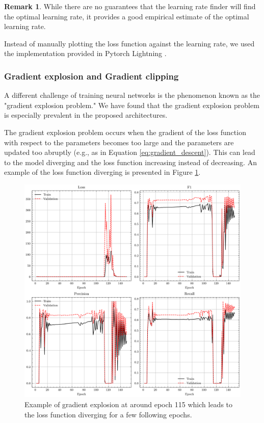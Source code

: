 \documentclass[a4paper, twoside]{report}
\theoremstyle{definition}
\newtheorem{remark}[theorem]{Remark}
\numberwithin{equation}{section}
\begin{document}
\begin{remark}
    While there are no guarantees that the learning rate finder will find the optimal learning rate,
    it provides a good empirical estimate of the optimal learning rate.
\end{remark}

Instead of manually plotting the loss function against the learning rate, we used the implementation
provided in Pytorch Lightning \cite{lightning.ai_2023_lr_finder}.


\subsubsection{Gradient explosion and Gradient clipping} \label{sec:gradient_clipping}
A different challenge of training neural networks is the phenomenon known as the "gradient explosion problem."
We have found that the gradient explosion problem is especially prevalent in the proposed architectures.

The gradient explosion problem occurs when the gradient of the loss function with respect to the parameters
becomes too large and the parameters are updated too abruptly (e.g., as in Equation \ref{eq:gradient_descent}).
This can lead to the model diverging and the loss function increasing instead of decreasing.
An example of the loss function diverging is presented in Figure \ref{fig:gradient_explosion}.

\begin{figure}[h!]
    \centering
    \includegraphics[scale=0.6]{gradient_explosion.png}
    \caption{Example of gradient explosion at around epoch 115 which leads to the loss function diverging for a few following epochs.}
    \label{fig:gradient_explosion}
\end{figure}
\end{document}
